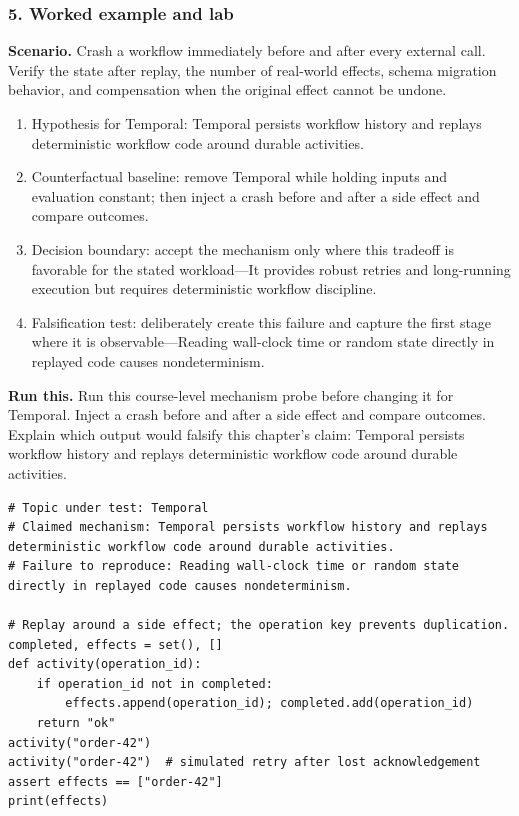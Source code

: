 \subsubsection*{5. Worked example and lab}
\textbf{Scenario.} Crash a workflow immediately before and after every external call. Verify the state after replay, the number of real-world effects, schema migration behavior, and compensation when the original effect cannot be undone.
\begin{enumerate}
\item Hypothesis for Temporal: Temporal persists workflow history and replays deterministic workflow code around durable activities.
\item Counterfactual baseline: remove Temporal while holding inputs and evaluation constant; then inject a crash before and after a side effect and compare outcomes.
\item Decision boundary: accept the mechanism only where this tradeoff is favorable for the stated workload—It provides robust retries and long-running execution but requires deterministic workflow discipline.
\item Falsification test: deliberately create this failure and capture the first stage where it is observable—Reading wall-clock time or random state directly in replayed code causes nondeterminism.
\end{enumerate}
\textbf{Run this.} Run this course-level mechanism probe before changing it for Temporal. Inject a crash before and after a side effect and compare outcomes. Explain which output would falsify this chapter's claim: Temporal persists workflow history and replays deterministic workflow code around durable activities.
\begin{Verbatim}[fontsize=\scriptsize]
# Topic under test: Temporal
# Claimed mechanism: Temporal persists workflow history and replays deterministic workflow code around durable activities.
# Failure to reproduce: Reading wall-clock time or random state directly in replayed code causes nondeterminism.

# Replay around a side effect; the operation key prevents duplication.
completed, effects = set(), []
def activity(operation_id):
    if operation_id not in completed:
        effects.append(operation_id); completed.add(operation_id)
    return "ok"
activity("order-42")
activity("order-42")  # simulated retry after lost acknowledgement
assert effects == ["order-42"]
print(effects)
\end{Verbatim}
